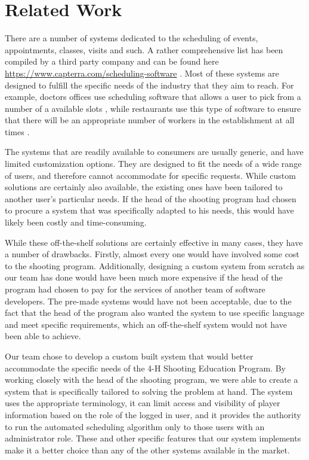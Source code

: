 \documentclass[sigconf]{acmart}
\begin{document}
\section{Related Work}%

There are a number of systems dedicated to the scheduling of events, appointments, classes, visits and such. A rather comprehensive list has been compiled by a third party company and can be found here \url{https://www.capterra.com/scheduling-software} \cite{capterra}. Most of these systems are designed to fulfill the specific needs of the industry that they aim to reach. For example, doctors offices use scheduling software that allows a user to pick from a number of a available slots \cite{doctor}, while restaurants use this type of software to ensure that there will be an appropriate number of workers in the establishment at all times \cite{restaurant}. 

The systems that are readily available to consumers are usually generic, and have limited customization options. They are designed to fit the needs of a wide range of users, and therefore cannot accommodate for specific requests. While custom solutions are certainly also available, the existing ones have been tailored to another user's particular needs. If the head of the shooting program had chosen to procure a system that was specifically adapted to his needs, this would have likely been costly and time-consuming.

While these off-the-shelf solutions are certainly effective in many cases, they have a number of drawbacks. Firstly, almost every one would have involved some cost to the shooting program. Additionally, designing a custom system from scratch as our team has done would have been much more expensive if the head of the program had chosen to pay for the services of another team of software developers. The pre-made systems would have not been acceptable, due to the fact that the head of the program also wanted the system to use specific language and meet specific requirements, which an off-the-shelf system would not have been able to achieve.

Our team chose to develop a custom built system that would better accommodate the specific needs of the 4-H Shooting Education Program. By working closely with the head of the shooting program, we were able to create a system that is specifically tailored to solving the problem at hand. The system uses the appropriate terminology, it can limit access and visibility of player information based on the role of the logged in user, and it provides the authority to run the automated scheduling algorithm only to those users with an administrator role. These and other specific features that our system implements make it a better choice than any of the other systems available in the market.
\end{document}
